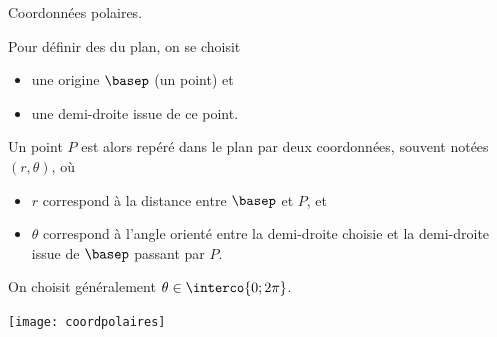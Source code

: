 \begin{frame}{Coordonnées polaires.}

Pour définir des  du
plan, on se choisit
\begin{itemize}
\item une origine $\basep$ (un point) et
\item une demi-droite issue de ce point.
\end{itemize}

Un point $P$ est alors repéré dans le plan par deux coordonnées, souvent notées $(r, \theta)$, où
\begin{itemize}
\item $r$ correspond à la distance entre $\basep$ et $P$, et
\item $\theta$ correspond à l'angle orienté entre la demi-droite choisie et la demi-droite issue de $\basep$ passant par $P$.
\end{itemize}
On choisit généralement $\theta \in \interco{0;2\pi}$.
\begin{center}
\texttt{[image: coordpolaires]}
\end{center}
\end{frame}
